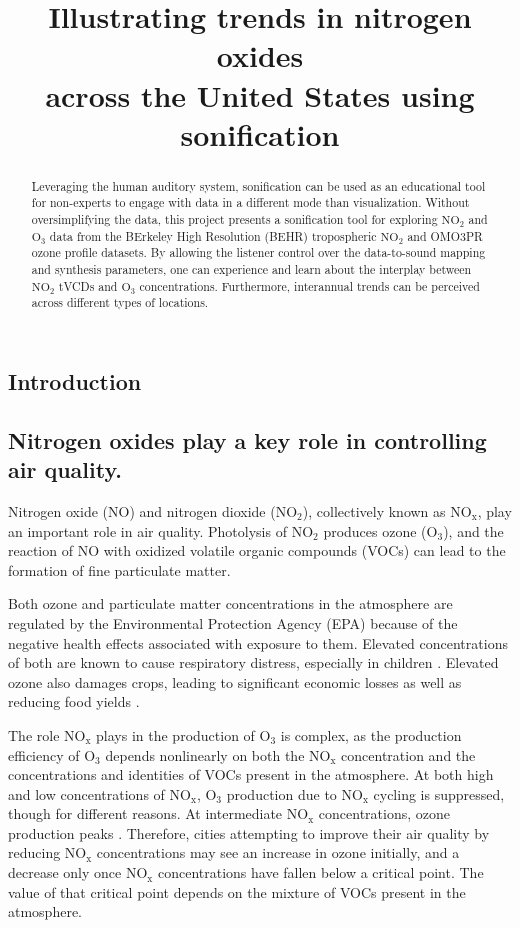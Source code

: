 \documentclass[a4paper,10pt,oneside]{article}
\title{Illustrating trends in nitrogen oxides \\across the United States using sonification}
\newcommand{\ce}[1]{$\mathrm{#1}$}
\begin{document}
\ninept
\maketitle

\begin{sloppy}

\begin{abstract}
    Leveraging the human auditory system, sonification can be used as an educational tool for non-experts to engage with data in a different mode than visualization.  Without oversimplifying the data, this project presents a sonification tool for exploring \ce{NO_2} and \ce{O_3} data from the BErkeley High Resolution (BEHR) tropospheric \ce{NO_2} and OMO3PR ozone profile datasets.  By allowing the listener control over the data-to-sound mapping and synthesis parameters, one can experience and learn about the interplay between \ce{NO_2} tVCDs and \ce{O_3} concentrations.  Furthermore, interannual trends can be perceived across different types of locations. 
\end{abstract}

\section{Introduction}
\label{sec:intro}

\subsection{Nitrogen oxides play a key role in controlling air quality.}
\label{sec:nox-chemistry}
Nitrogen oxide (\ce{NO}) and nitrogen dioxide (\ce{NO_2}), collectively known as \ce{NO_x}, play an important role in air quality.  Photolysis of \ce{NO_2} produces ozone (\ce{O_3}), and the reaction of \ce{NO} with oxidized volatile organic compounds (VOCs) can lead to the formation of fine particulate matter.

Both ozone and particulate matter concentrations in the atmosphere are regulated by the Environmental Protection Agency (EPA) because of the negative health effects associated with exposure to them. Elevated concentrations of both are known to cause respiratory distress, especially in children \cite{romieu96}. Elevated ozone also damages crops, leading to significant economic losses as well as reducing food yields \cite{tai14}.

The role \ce{NO_x} plays in the production of \ce{O_3} is complex, as the production efficiency of \ce{O_3} depends nonlinearly on both the \ce{NO_x} concentration and the concentrations and identities of VOCs present in the atmosphere. At both high and low concentrations of \ce{NO_x}, \ce{O_3} production due to \ce{NO_x} cycling is suppressed, though for different reasons. At intermediate \ce{NO_x} concentrations, ozone production peaks \cite{murphy07}.  Therefore, cities attempting to improve their air quality by reducing \ce{NO_x} concentrations may see an increase in ozone initially, and a decrease only once \ce{NO_x} concentrations have fallen below a critical point. The value of that critical point depends on the mixture of VOCs present in the atmosphere.


\end{sloppy}
\end{document}
